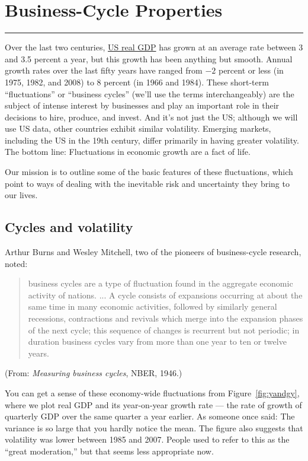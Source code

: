 \chapter{Business-Cycle Properties}\label{chp:bcpr}
\hypertarget{cycles}{}


\rule{\textwidth}{1pt}

Over the last two centuries,
\href{http://research.stlouisfed.org/fred2/series/GDPC1?cid=106}{US real GDP}
has grown at an average
rate between 3 and 3.5 percent a year,
but this growth has been anything but smooth.
Annual growth rates over the last fifty years have
ranged from $-2$ percent or less (in 1975, 1982, and 2008)
to 8 percent (in 1966 and 1984).
These short-term ``fluctuations'' or ``business cycles''
(we'll use the terms interchangeably)
are the subject of intense interest by businesses
and play an important role in their decisions to hire, produce, and invest.
And it's not just the US;
although we will use US data, other countries exhibit similar
volatility.
Emerging markets, including the US in the 19th century,
differ primarily in having greater volatility.
The bottom line:  Fluctuations in economic growth
are a fact of life.

Our mission is to outline some of the basic features
of these fluctuations, which point to ways of dealing with
the inevitable risk and uncertainty they bring to our lives.


\section{Cycles and volatility }

Arthur Burns and Wesley Mitchell,
two of the pioneers of business-cycle research, noted:
%
\begin{quote}
{business cycles 
 are a type of
fluctuation found in the aggregate economic activity of
nations. ... A cycle consists of expansions occurring at about the
same time in many economic activities, followed by similarly
general recessions, contractions and revivals which merge into the
expansion phases of the next cycle; this sequence of changes is
recurrent but not periodic; in duration business cycles
 vary from
more than one year to ten or twelve years.}
\end{quote}
(From: {\it Measuring business cycles\/}, NBER, 1946.)

You can get a sense of these economy-wide fluctuations
from Figure~\ref{fig:yandgy},
where we plot real GDP and its year-on-year growth rate --- the rate of growth of quarterly GDP over the same quarter a year earlier.
As someone once said:  The variance is so large that you hardly notice the mean.
The figure also suggests that volatility was lower between 1985
and 2007.
People used to refer to this as the ``great moderation,''
 but that seems less appropriate now.

